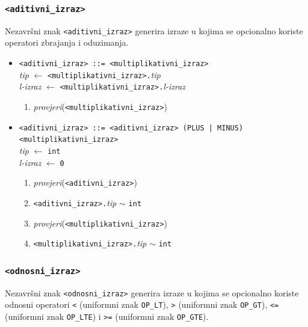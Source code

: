 \documentclass[times, 12pt, utf8]{book}
\begin{document}
\subsubsection{\texttt{<aditivni\_izraz>}}

Nezavršni znak \verb|<aditivni_izraz>| generira izraze u kojima se opcionalno koriste operatori zbrajanja i oduzimanja.

\begin{itemize}

\item
\verb|<aditivni_izraz> ::= <multiplikativni_izraz>|\\
\emph{tip} \(\leftarrow\) \verb|<multiplikativni_izraz>.|\emph{tip}\\
\emph{l-izraz} \(\leftarrow\) \verb|<multiplikativni_izraz>.|\emph{l-izraz}
\begin{enumerate}
\item
\emph{provjeri}(\verb|<multiplikativni_izraz>|)
\end{enumerate}

\item
\verb#<aditivni_izraz> ::= <aditivni_izraz> (PLUS | MINUS) <multiplikativni_izraz>#\\
\emph{tip} \(\leftarrow\) \verb|int|\\
\emph{l-izraz} \(\leftarrow\) \verb|0|
\begin{enumerate}
\item
\emph{provjeri}(\verb|<aditivni_izraz>|)
\item
\verb|<aditivni_izraz>.|\emph{tip} \(\sim\) \verb|int|
\item
\emph{provjeri}(\verb|<multiplikativni_izraz>|)
\item
\verb|<multiplikativni_izraz>.|\emph{tip} \(\sim\) \verb|int|
\end{enumerate}

\end{itemize}

\subsubsection{\texttt{<odnosni\_izraz>}}

Nezavršni znak \verb|<odnosni_izraz>| generira izraze u kojima se opcionalno koriste odnosni operatori \verb|<| (uniformni znak \verb|OP_LT|), \verb|>| (uniformni znak \verb|OP_GT|), \verb|<=| (uniformni znak \verb|OP_LTE|) i \verb|>=| (uniformni znak \verb|OP_GTE|).
\end{document}
